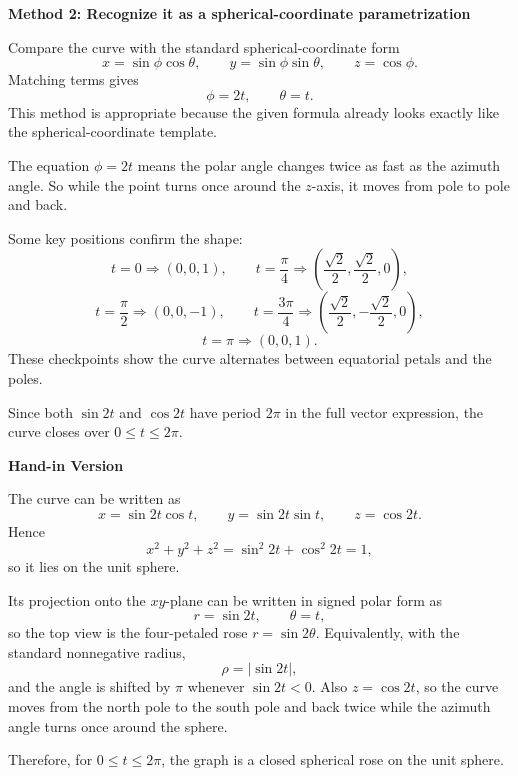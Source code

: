 \documentclass[a4paper,12pt,twocolumn]{article}
\newenvironment{solutionbox}{\begin{framed}}{\end{framed}}
\begin{document}
\begin{solutionbox}
\textbf{Method 2: Recognize it as a spherical-coordinate parametrization}

\begin{steps}
\item Compare the curve with the standard spherical-coordinate form
\[
x=\sin\phi\cos\theta,\qquad y=\sin\phi\sin\theta,\qquad z=\cos\phi.
\]
Matching terms gives
\[
\phi=2t,\qquad \theta=t.
\]
This method is appropriate because the given formula already looks exactly like the spherical-coordinate template.

\item The equation \(\phi=2t\) means the polar angle changes twice as fast as the azimuth angle. So while the point turns once around the \(z\)-axis, it moves from pole to pole and back.

\item Some key positions confirm the shape:
\[
t=0 \Rightarrow (0,0,1),\qquad
t=\frac{\pi}{4}\Rightarrow \left(\frac{\sqrt2}{2},\frac{\sqrt2}{2},0\right),
\]
\[
t=\frac{\pi}{2}\Rightarrow (0,0,-1),\qquad
t=\frac{3\pi}{4}\Rightarrow \left(\frac{\sqrt2}{2},-\frac{\sqrt2}{2},0\right),
\]
\[
t=\pi \Rightarrow (0,0,1).
\]
These checkpoints show the curve alternates between equatorial petals and the poles.

\item Since both \(\sin 2t\) and \(\cos 2t\) have period \(2\pi\) in the full vector expression, the curve closes over \(0\le t\le 2\pi\).
\end{steps}
\end{solutionbox}

\begin{solutionbox}
\textbf{Hand-in Version}

The curve can be written as
\[
x=\sin 2t\cos t,\qquad y=\sin 2t\sin t,\qquad z=\cos 2t.
\]
Hence
\[
x^2+y^2+z^2=\sin^2 2t+\cos^2 2t=1,
\]
so it lies on the unit sphere.

Its projection onto the \(xy\)-plane can be written in signed polar form as
\[
r=\sin 2t,\qquad \theta=t,
\]
so the top view is the four-petaled rose \(r=\sin 2\theta\). Equivalently, with the standard nonnegative radius,
\[
\rho=|\sin 2t|,
\]
and the angle is shifted by \(\pi\) whenever \(\sin 2t<0\). Also \(z=\cos 2t\), so the curve moves from the north pole to the south pole and back twice while the azimuth angle turns once around the sphere.

Therefore, for \(0\le t\le 2\pi\), the graph is a closed spherical rose on the unit sphere.

\begin{center}
\end{center}
\end{solutionbox}
\end{document}
